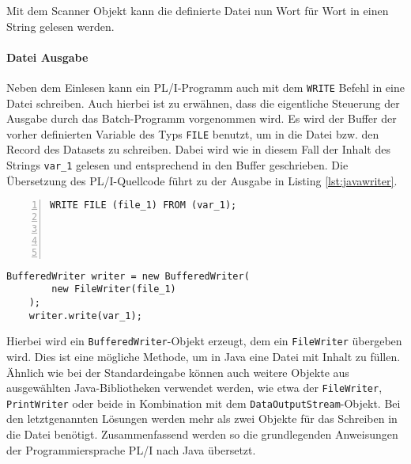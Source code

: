 Mit dem Scanner Objekt kann die definierte Datei nun Wort für Wort in einen String gelesen werden.

\paragraph{Datei Ausgabe}

Neben dem Einlesen kann ein PL/I-Programm auch mit dem \verb+WRITE+ Befehl in eine Datei schreiben.
Auch hierbei ist zu erwähnen, dass die eigentliche Steuerung der Ausgabe durch das Batch-Programm vorgenommen wird.
Es wird der Buffer der vorher definierten Variable des Typs \verb+FILE+ benutzt, um in die Datei bzw. den Record
des Datasets zu schreiben. Dabei wird wie in diesem Fall der Inhalt des Strings \verb+var_1+ gelesen und entsprechend
in den Buffer geschrieben.
Die Übersetzung des PL/I-Quellcode führt zu der Ausgabe in Listing \ref{lst:javawriter}.

\begin{minipage}[b]{0.48\linewidth}
	\centering
	\lstset{language=PL/I,label=SliceExaple}
	\begin{lstlisting}[frame=single, numbers=left, mathescape,%
		caption={Dateiausgabe}, label={lst:javawriter},  basicstyle=\fontsize{9}{13}\selectfont\ttfamily]
	WRITE FILE (file_1) FROM (var_1);	
	
	
	
	
	\end{lstlisting}
\end{minipage}
\hspace{0.5cm}
\begin{minipage}[b]{0.48\linewidth}
	\centering
	\lstset{language=Java,label=SliceExaple}
	\begin{lstlisting}[frame=single, mathescape,%
		title={" "},  basicstyle=\fontsize{9}{13}\selectfont\ttfamily]
	BufferedWriter writer = new BufferedWriter(
		new FileWriter(file_1)
	); 
	writer.write(var_1);
	\end{lstlisting}
\end{minipage}  

Hierbei wird ein \verb+BufferedWriter+-Objekt erzeugt, dem ein \verb+FileWriter+ übergeben wird. Dies ist eine mögliche Methode, um in Java eine Datei mit Inhalt zu füllen. Ähnlich wie bei der Standardeingabe können auch weitere Objekte aus ausgewählten Java-Bibliotheken verwendet werden, wie etwa der \verb+FileWriter+, \verb+PrintWriter+ oder beide in Kombination mit dem \verb+DataOutputStream+-Objekt. Bei den letztgenannten Lösungen werden mehr als zwei Objekte für das Schreiben in die Datei benötigt.
Zusammenfassend werden so die grundlegenden Anweisungen der Programmiersprache PL/I nach Java übersetzt. 

